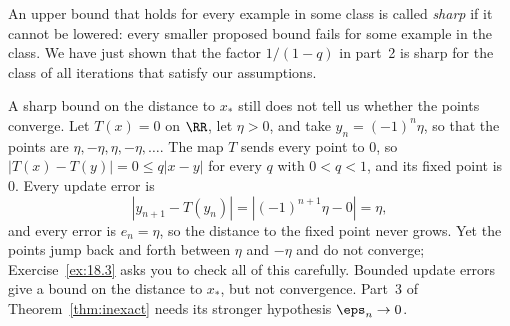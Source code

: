 An upper bound that holds for every example in some class is called \emph{sharp} if it cannot be lowered: every smaller proposed bound fails for some example in the class. We have just shown that the factor $1/(1-q)$ in part~2 is sharp for the class of all iterations that satisfy our assumptions.

A sharp bound on the distance to $x_*$ still does not tell us whether the points converge. Let $T(x)=0$ on $\RR$, let $\eta>0$, and take $y_n=(-1)^n\eta$, so that the points are $\eta,-\eta,\eta,-\eta,\ldots$. The map $T$ sends every point to $0$, so $|T(x)-T(y)|=0\le q|x-y|$ for every $q$ with $0<q<1$, and its fixed point is $0$. Every update error is
\[
 |y_{n+1}-T(y_n)|=|(-1)^{n+1}\eta-0|=\eta,
\]
and every error is $e_n=\eta$, so the distance to the fixed point never grows. Yet the points jump back and forth between $\eta$ and $-\eta$ and do not converge; Exercise~\ref{ex:18.3} asks you to check all of this carefully. Bounded update errors give a bound on the distance to $x_*$, but not convergence. Part~3 of Theorem~\ref{thm:inexact} needs its stronger hypothesis $\eps_n\to0$.

